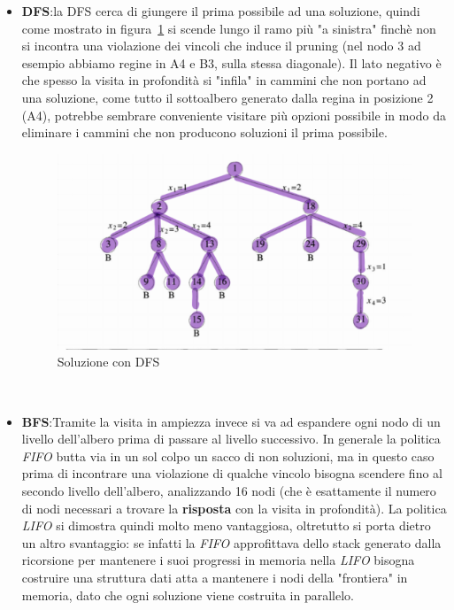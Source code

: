 \documentclass[a4paper]{article}
\begin{document}
\begin{itemize}
	\item \textbf{DFS}:la DFS cerca di giungere il prima possibile ad una soluzione, quindi come mostrato in figura~\ref{FIG:C_2_DFS} si scende lungo il ramo più "a sinistra" finchè non si incontra una violazione dei vincoli che induce il pruning (nel nodo 3 ad esempio abbiamo regine in A4 e B3, sulla stessa diagonale).
		Il lato negativo è che spesso la visita in profondità si "infila" in cammini che non portano ad una soluzione, come tutto il sottoalbero generato dalla regina in posizione 2 (A4), potrebbe sembrare conveniente visitare più opzioni possibile in modo da eliminare i cammini che non producono soluzioni il prima possibile.
\begin{figure}[!ht]
\centering
\includegraphics[width=1\textwidth]{./img/C_2_DFS.png}
\caption{Soluzione con DFS} \label{FIG:C_2_DFS}
\end{figure}\\
	\item \textbf{BFS}:Tramite la visita in ampiezza invece si va ad espandere ogni nodo di un livello dell'albero prima di passare al livello successivo.
		In generale la politica \textit{FIFO} butta via in un sol colpo un sacco di non soluzioni, ma in questo caso prima di incontrare una violazione di qualche vincolo bisogna scendere fino al secondo livello dell'albero, analizzando 16 nodi (che è esattamente il numero di nodi necessari a trovare la \textbf{risposta} con la visita in profondità).
		La politica \textit{LIFO} si dimostra quindi molto meno vantaggiosa, oltretutto si porta dietro un altro svantaggio: se infatti la \textit{FIFO} approfittava dello stack generato dalla ricorsione per mantenere i suoi progressi in memoria nella \textit{LIFO} bisogna costruire una struttura dati atta a mantenere i nodi della "frontiera" in memoria, dato che ogni soluzione viene costruita in parallelo.

\end{itemize}
\end{document}
